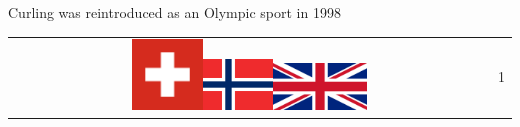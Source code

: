 \documentclass{beamer}
\begin{document}
\begin{frame}
\begin{columns}
\begin{column}{0.45\textwidth}
\begin{block}{Curling was reintroduced as an Olympic sport in 1998}
\begin{table}
\begin{tabular}{cc}
                            \includegraphics[width=0.15\textwidth]{Images/Switzerland.png}\includegraphics[width=0.15\textwidth]{Images/Norway.png}\includegraphics[width=0.2\textwidth]{Images/UK.png}            &1\\
                        \end{tabular}
                    \end{table}
            \end{block}
        \end{column}
    \end{columns}
\end{frame}
\end{document}
